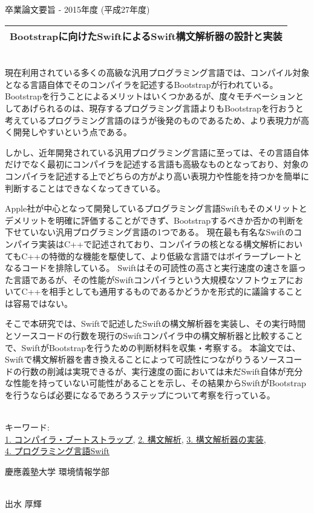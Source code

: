 卒業論文要旨 - 2015年度 (平成27年度)
~ \\
\begin{center}
\begin{Large}
\begin{tabular}{|c|} \hline
Bootstrapに向けたSwiftによるSwift構文解析器の設計と実装
\\ \hline
\end{tabular}
\end{Large}
\end{center}
~  \\

現在利用されている多くの高級な汎用プログラミング言語では、コンパイル対象となる言語自体でそのコンパイラを記述するBootstrapが行われている。
Bootstrapを行うことによるメリットはいくつかあるが、度々モチベーションとしてあげられるのは、現存するプログラミング言語よりもBootstrapを行おうと考えているプログラミング言語のほうが後発のものであるため、より表現力が高く開発しやすいという点である。

しかし、近年開発されている汎用プログラミング言語に至っては、その言語自体だけでなく最初にコンパイラを記述する言語も高級なものとなっており、対象のコンパイラを記述する上でどちらの方がより高い表現力や性能を持つかを簡単に判断することはできなくなってきている。

Apple社が中心となって開発しているプログラミング言語Swiftもそのメリットとデメリットを明確に評価することができず、Bootstrapするべきか否かの判断を下せていない汎用プログラミング言語の1つである。
現在最も有名なSwiftのコンパイラ実装はC++で記述されており、コンパイラの核となる構文解析においてもC++の特徴的な機能を駆使して、より低級な言語ではボイラープレートとなるコードを排除している。
Swiftはその可読性の高さと実行速度の速さを謳った言語であるが、その性能がSwiftコンパイラという大規模なソフトウェアにおいてC++を相手としても通用するものであるかどうかを形式的に議論することは容易ではない。

そこで本研究では、Swiftで記述したSwiftの構文解析器を実装し、その実行時間とソースコードの行数を現行のSwiftコンパイラ中の構文解析器と比較することで、SwiftがBootstrapを行うための判断材料を収集・考察する。
本論文では、Swiftで構文解析器を書き換えることによって可読性につながりうるソースコードの行数の削減は実現できるが、実行速度の面においては未だSwift自体が充分な性能を持っていない可能性があることを示し、その結果からSwiftがBootstrapを行うならば必要になるであろうステップについて考察を行っている。

~ \\
キーワード:\\
\underline{1. コンパイラ・ブートストラップ},
\underline{2. 構文解析},
\underline{3. 構文解析器の実装},\\
\underline{4. プログラミング言語Swift}
\begin{flushright}
慶應義塾大学 環境情報学部\\
~ \\
\begin{Large}
出水 厚輝
\end{Large}
\end{flushright}
